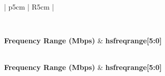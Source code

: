 \documentclass[main\_\_EN.tex]{subfiles}
\begin{document}
\begin{longtable}{| p{5cm} | R{5cm} |}
    \caption{Frequency Ranges Supported by MIPI BD D-PHY} \label{tab:mipidsi-hsfreq} \\
    \hline
    
    \textbf{Frequency Range (Mbps)} & \textbf{hsfreqrange[5:0]} \\ \hline
    \endfirsthead

    \\\hline
    \textbf{Frequency Range (Mbps)} & \textbf{hsfreqrange[5:0]} \\ \hline
    \endhead

     \\
    \endfoot

    \endlastfoot
    

\end{longtable}
\end{document}
